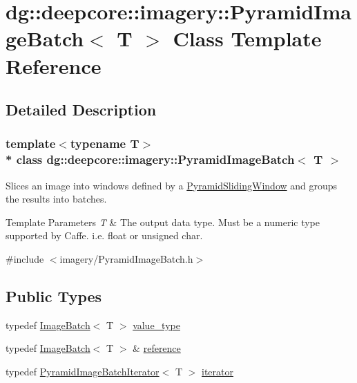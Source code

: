 \hypertarget{classdg_1_1deepcore_1_1imagery_1_1_pyramid_image_batch}{}\section{dg\+:\+:deepcore\+:\+:imagery\+:\+:Pyramid\+Image\+Batch$<$ T $>$ Class Template Reference}
\label{classdg_1_1deepcore_1_1imagery_1_1_pyramid_image_batch}


\subsection{Detailed Description}
\subsubsection*{template$<$typename T$>$\\*
class dg\+::deepcore\+::imagery\+::\+Pyramid\+Image\+Batch$<$ T $>$}

Slices an image into windows defined by a \hyperlink{classdg_1_1deepcore_1_1imagery_1_1_pyramid_sliding_window}{Pyramid\+Sliding\+Window} and groups the results into batches. 


\begin{DoxyTemplParams}{Template Parameters}
{\em T} & The output data type. Must be a numeric type supported by Caffe. i.\+e. float or unsigned char. \\
\hline
\end{DoxyTemplParams}


{\ttfamily \#include $<$imagery/\+Pyramid\+Image\+Batch.\+h$>$}

\subsection*{Public Types}
\begin{DoxyCompactItemize}
\item 
typedef \hyperlink{structdg_1_1deepcore_1_1imagery_1_1_image_batch}{Image\+Batch}$<$ T $>$ \hyperlink{classdg_1_1deepcore_1_1imagery_1_1_pyramid_image_batch_a64329b050ba9864aec3e3532c7a2aad3}{value\+\_\+type}
\item 
typedef \hyperlink{structdg_1_1deepcore_1_1imagery_1_1_image_batch}{Image\+Batch}$<$ T $>$ \& \hyperlink{classdg_1_1deepcore_1_1imagery_1_1_pyramid_image_batch_ac40a046993c4d0ccdc5a44659b130c68}{reference}
\item 
typedef \hyperlink{classdg_1_1deepcore_1_1imagery_1_1_pyramid_image_batch_iterator}{Pyramid\+Image\+Batch\+Iterator}$<$ T $>$ \hyperlink{classdg_1_1deepcore_1_1imagery_1_1_pyramid_image_batch_a4cad1aac53a144da29324e48ea357f78}{iterator}
\end{DoxyCompactItemize}
